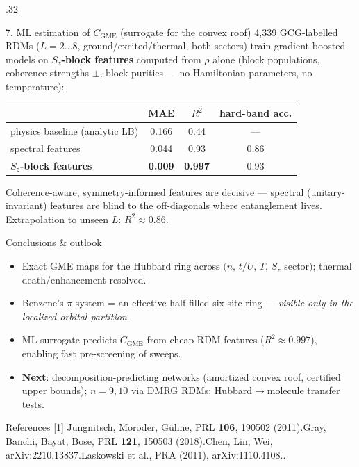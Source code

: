 \documentclass[final]{beamer}
\newcommand{\CGME}{\ensuremath{C_{\mathrm{GME}}}}
\begin{document}
\begin{frame}[t]
\begin{columns}[t]
\begin{column}{.32\linewidth}
\begin{block}{7. ML estimation of \CGME{} (surrogate for the convex roof)}
4{,}339 GCG-labelled RDMs ($L{=}2\ldots8$, ground/excited/thermal, both
sectors) train gradient-boosted models on \textbf{$S_z$-block features}
computed from $\rho$ alone (block populations, coherence strengths $\pm$,
block purities — no Hamiltonian parameters, no temperature):
\begin{center}
\small
\begin{tabular}{@{}lccc@{}}
\toprule
 & MAE & $R^2$ & hard-band acc. \\
\midrule
physics baseline (analytic LB) & 0.166 & 0.44 & --- \\
spectral features              & 0.044 & 0.93 & 0.86 \\
\textbf{$S_z$-block features}  & \textbf{0.009} & \textbf{0.997} & 0.93 \\
\bottomrule
\end{tabular}
\end{center}
{\small Coherence-aware, symmetry-informed features are decisive —
spectral (unitary-invariant) features are blind to the off-diagonals where
entanglement lives. Extrapolation to unseen $L$: $R^2\approx0.86$.}
\end{block}

\begin{alertblock}{Conclusions \& outlook}
\begin{itemize}
  \item Exact GME maps for the Hubbard ring across $(n,\,t/U,\,T,\,S_z$
        sector$)$; thermal death/enhancement resolved.
  \item Benzene's $\pi$ system = an effective half-filled six-site ring —
        \emph{visible only in the localized-orbital partition}.
  \item ML surrogate predicts \CGME{} from cheap RDM features
        ($R^2\!\approx\!0.997$), enabling fast pre-screening of sweeps.
  \item \textbf{Next}: decomposition-predicting networks (amortized convex
        roof, certified upper bounds); $n{=}9,10$ via DMRG RDMs;
        Hubbard$\to$molecule transfer tests.
\end{itemize}
\end{alertblock}

\begin{block}{References}
\small
[1] Jungnitsch, Moroder, G\"uhne, PRL \textbf{106}, 190502 (2011).\;
[2] Gray, Banchi, Bayat, Bose, PRL \textbf{121}, 150503 (2018).\;
[3] Chen, Lin, Wei, arXiv:2210.13837.\;
[4] Laskowski et al., PRA (2011), arXiv:1110.4108..
\end{block}

\end{column}
\end{columns}
\end{frame}
\end{document}

